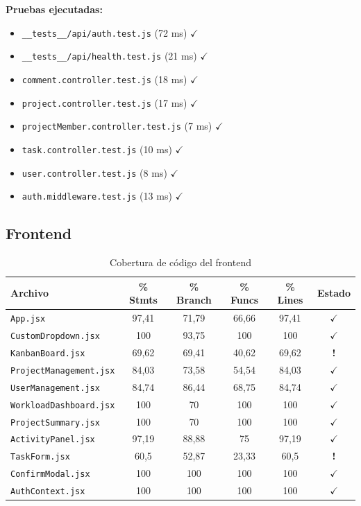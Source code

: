 \documentclass[12pt, a4paper]{article}
\newcommand{\ok}{\textcolor{accentgreen}{$\checkmark$}}
\newcommand{\warn}{\textcolor{accentorange}{\textbf{!}}}
\begin{document}
\textbf{Pruebas ejecutadas:}
\begin{itemize}[leftmargin=1.5em, topsep=2pt, itemsep=2pt]
  \item \texttt{\_\_tests\_\_/api/auth.test.js} (72 ms) \ok
  \item \texttt{\_\_tests\_\_/api/health.test.js} (21 ms) \ok
  \item \texttt{comment.controller.test.js} (18 ms) \ok
  \item \texttt{project.controller.test.js} (17 ms) \ok
  \item \texttt{projectMember.controller.test.js} (7 ms) \ok
  \item \texttt{task.controller.test.js} (10 ms) \ok
  \item \texttt{user.controller.test.js} (8 ms) \ok
  \item \texttt{auth.middleware.test.js} (13 ms) \ok
\end{itemize}

\subsection{Frontend}

\begin{table}[H]
\centering
\renewcommand{\arraystretch}{1.4}
\begin{tabularx}{\linewidth}{Xccccc}
\toprule
\rowcolor{lightblue}
\textbf{Archivo} & \textbf{\% Stmts} & \textbf{\% Branch} & \textbf{\% Funcs}
& \textbf{\% Lines} & \textbf{Estado} \\
\midrule
\rowcolor{coverok}
\texttt{App.jsx}                  & 97,41 & 71,79 & 66,66 & 97,41 & \ok \\
\rowcolor{coverok}
\texttt{CustomDropdown.jsx}       & 100   & 93,75 & 100   & 100   & \ok \\
\rowcolor{coverwarn}
\texttt{KanbanBoard.jsx}          & 69,62 & 69,41 & 40,62 & 69,62 & \warn \\
\rowcolor{coverok}
\texttt{ProjectManagement.jsx}    & 84,03 & 73,58 & 54,54 & 84,03 & \ok \\
\rowcolor{coverok}
\texttt{UserManagement.jsx}       & 84,74 & 86,44 & 68,75 & 84,74 & \ok \\
\rowcolor{coverok}
\texttt{WorkloadDashboard.jsx}    & 100   & 70    & 100   & 100   & \ok \\
\rowcolor{coverok}
\texttt{ProjectSummary.jsx}       & 100   & 70    & 100   & 100   & \ok \\
\rowcolor{coverok}
\texttt{ActivityPanel.jsx}        & 97,19 & 88,88 & 75    & 97,19 & \ok \\
\rowcolor{coverwarn}
\texttt{TaskForm.jsx}             & 60,5  & 52,87 & 23,33 & 60,5  & \warn \\
\rowcolor{coverok}
\texttt{ConfirmModal.jsx}         & 100   & 100   & 100   & 100   & \ok \\
\rowcolor{coverok}
\texttt{AuthContext.jsx}          & 100   & 100   & 100   & 100   & \ok \\
\bottomrule
\end{tabularx}
\caption{Cobertura de código del frontend}
\end{table}
\end{document}
